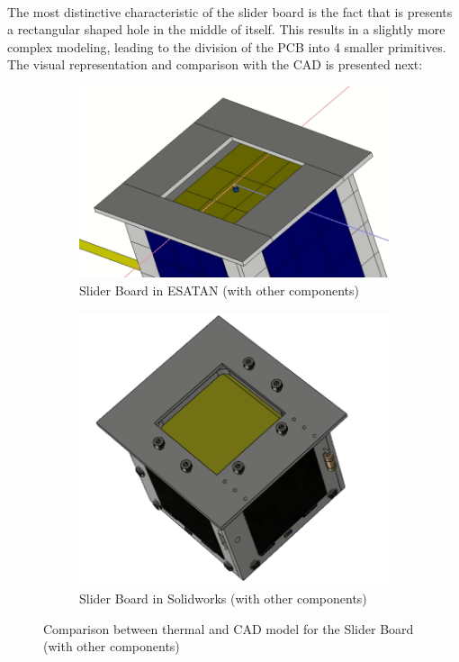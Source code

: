 \paragraph{}

The most distinctive characteristic of the slider board is the fact that is presents a rectangular shaped hole in the middle
of itself. This results in a slightly more complex modeling, leading to the division of the PCB into 4 smaller primitives. The visual representation and comparison with the CAD
is presented next: 


\begin{figure}[H]
    \centering
    \begin{subfigure}{.5\textwidth}
      \centering
      \includegraphics[width=.6\linewidth]{res/img/5_simulationanalisys/Comparisons/ESATAN/SliderPCB.PNG}
      \caption{Slider Board in ESATAN (with other components)}
      \label{fig:sliderpcb}
    \end{subfigure}%
    \begin{subfigure}{.5\textwidth}
      \centering
      \includegraphics[width=.5\linewidth]{res/img/5_simulationanalisys/Comparisons/SLDW/SliderPCB_Solid.PNG}
      \caption{Slider Board in Solidworks (with other components)}
      \label{fig:sliderpcbsolid}
    \end{subfigure}
    \caption{Comparison between thermal and CAD model for the Slider Board (with other components)}
    \label{fig:sliderpcbim}
\end{figure}

